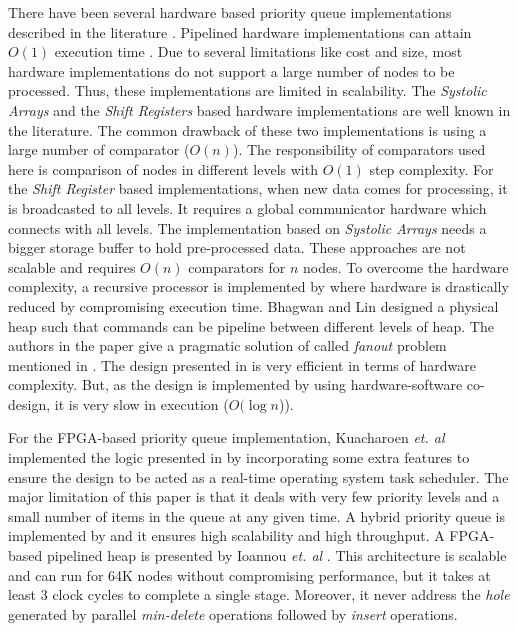 \documentclass[10pt, conference, compsocconf]{IEEEtran}
\begin{document}
There have been several hardware based priority queue implementations described in the literature \cite{hw1,hw2,hw3,hw5,hw6,hw7,hw8,hw9}.
Pipelined hardware implementations can attain $O(1)$ execution time \cite{hw5,hw6}.
Due to several limitations like cost and size, most hardware implementations do not support a large number of nodes to be processed.
Thus, these implementations are limited in scalability.
The {\it Systolic Arrays} and the {\it Shift Registers} \cite{hw8,hw9} based hardware implementations are well known in the literature.
The common drawback of these two implementations is using a large number of comparator ($O(n)$).
The responsibility of comparators used here is comparison of nodes in different levels with $O(1)$ step complexity.
For the {\it Shift Register} \cite{hw9} based implementations, when new data comes for processing, it is broadcasted to all levels.
It requires a global communicator hardware which connects with all levels.
The implementation based on {\it Systolic Arrays} \cite{hw8} needs a bigger storage buffer to hold pre-processed data.
These approaches are not scalable and requires $O(n)$ comparators for $n$ nodes.
To overcome the hardware complexity, a recursive processor is implemented by \cite{hw10} where hardware is drastically reduced by compromising execution time.
Bhagwan and Lin \cite{hw2} designed a physical heap such that commands can be pipeline between different levels of heap.
The authors in the paper \cite{hw1} give a pragmatic solution of called {\it fanout} problem mentioned in \cite{hw3}.
The design presented in \cite{hw11} is very efficient in terms of hardware complexity. But, as the design is implemented by using hardware-software co-design, it is very slow in execution ($O(\log n$)).

For the FPGA-based priority queue implementation,  Kuacharoen {\it et. al} \cite{fpga3} implemented the logic presented in \cite{hw3} by incorporating some extra features to ensure the design to be acted as a real-time operating system task scheduler.
The major limitation of this paper is that it deals with very few priority levels and a small number of items in the queue at any given time.
A hybrid priority queue is implemented by \cite{fpga2} and it ensures high scalability and high throughput.
A FPGA-based pipelined heap is presented by Ioannou {\it et. al} \cite{fpga1}.
This architecture is scalable and can run for 64K nodes without compromising performance, but it takes at least 3 clock cycles to complete a single stage.
Moreover, it never address the {\it hole} generated by parallel {\it min-delete} operations followed by {\it insert} operations.
\end{document}

